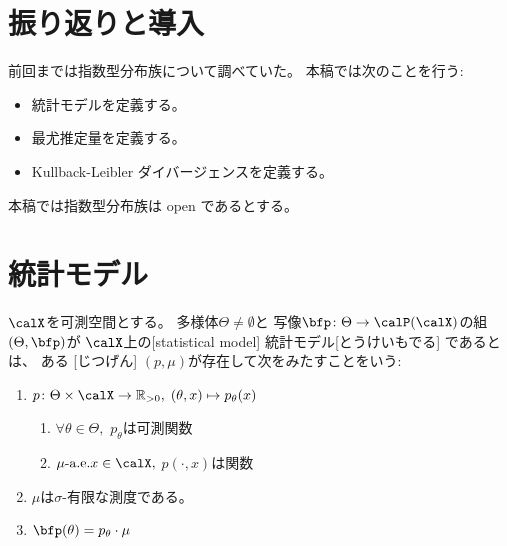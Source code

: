 \documentclass[report]{jlreq}
\begin{document}
%

%
\section*{振り返りと導入}

前回までは指数型分布族について調べていた。
本稿では次のことを行う:
\begin{itemize}
    \item 統計モデルを定義する。
    \item 最尤推定量を定義する。
    \item Kullback-Leibler ダイバージェンスを定義する。
\end{itemize}

本稿では指数型分布族は open であるとする。

%
\section{統計モデル}

\begin{definition}[統計モデル]
    $\calX$を可測空間とする。
    多様体$\Theta \neq \emptyset$と
    写像$\bfp \colon \Theta \to \calP(\calX)$の組$(\Theta, \bfp)$が
    $\calX$上の[statistical model]
        {統計モデル}[とうけいもでる]
    であるとは、
    ある
    [じつげん]
    $(p, \mu)$が存在して次をみたすことをいう:
    \begin{enumerate}[label=(\roman*)]
        \item $p \colon \Theta \times \calX \to \R_{> 0}, \; (\theta, x) \mapsto p_\theta(x)$
            \begin{enumerate}[label=(\roman{enumi}-\alph*)]
                \item $\forall \theta \in \Theta,$ \; $p_\theta$は可測関数
                \item $\text{$\mu$-a.e.} x \in \calX,$ \; $p(\cdot, x)$は{\smooth}関数
            \end{enumerate}
        \item $\mu$は$\sigma$-有限な測度である。
        \item $\bfp(\theta) = p_\theta \cdot \mu$
    \end{enumerate}
\end{definition}
\end{document}
